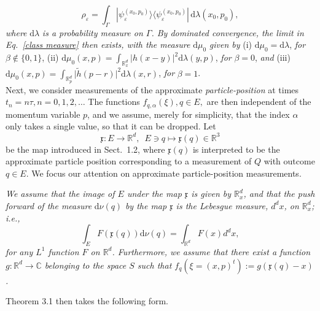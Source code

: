 \documentclass[12pt]{article}
\begin{document}
$$\rho_{\varepsilon} = \int_{\Gamma} |\psi_{\varepsilon}^{(x_0,p_0)}\rangle \langle \psi_{\varepsilon}^{(x_0,p_0)}| \,
\text{d}\lambda(x_0, p_0), $$
\textit{where} $\text{d}\lambda$ \textit{is a probability measure on $\Gamma$. By dominated convergence, the limit in 
Eq.~\eqref{class measure} then exists, with the measure} $\text{d}\mu_0$ \textit{given by} (i) $\text{d}\mu_0 = \text{d}\lambda$, \textit{for} $\beta\notin \{0,1\}$, (ii) $\text{d}\mu_{0}(x, p) = \int_{\mathbb{R}_{x}^{d}} \vert h(x-y)\vert^{2} \text{d}\lambda(y,p)$,
\textit{for} $\beta =0$, \textit{and} (iii) $\text{d}\mu_0 (x, p) = \int_{\mathbb{R}_{p}^{d}} \vert \widetilde{h}(p-r)\vert^{2} 
\text{d}\lambda(x,r)$, \textit{for} $\beta=1$.\\

Next, we consider measurements of the approximate \textit{particle-position} at times $t_n= n\tau, n=0,1,2,\dots$ 
The functions $f_{q, \alpha}(\xi), q\in E,$ are then independent of the momentum variable $p$, and we assume,
merely for simplicity, that the index $\alpha$ only takes a single value, so that it can be dropped. Let
$$\mathfrak{x}: E \rightarrow \mathbb{R}^{d}, \,\,\,E\ni q \mapsto \mathfrak{x}(q) \in \mathbb{R}^{3}$$
be the map introduced in Sect.~1.2, where $\mathfrak{x}(q)$ is interpreted to be the approximate particle position 
corresponding to a measurement of $Q$ with outcome $q\in E$. We focus our attention on approximate particle-position 
measurements.

\vspace{0.15cm} \textit{We assume that 
the image of $E$ under the map $\mathfrak{x}$ is given by $\mathbb{R}^{d}_{x}$, and
that the push forward of the measure} d$\nu(q)$ \textit{by the map $\mathfrak{x}$ is 
the Lebesgue measure, $d^{d}x$, on $\mathbb{R}^{d}_{x}$; i.e.,}
\begin{equation}\label{transl-invariance}
\int_{E} F(\mathfrak{x}(q)) \text{d}\nu(q) = \int_{\mathbb{R}^{d}} F(x) d^{d}x,
\end{equation}
\textit{for any $L^1$ function $F$ on $\mathbb{R}^{d}$.
Furthermore, we assume that there exist a function 
\mbox{$g: \mathbb{R}^{d}\rightarrow \mathbb{C}$} belonging to the space $S$ such that 
\mbox{$f_{q}(\xi=(x,p)^{t}) := g(\mathfrak{x}(q)-x)$}.}

\vspace{0.15cm}Theorem 3.1 then takes the following form.
\end{document}
